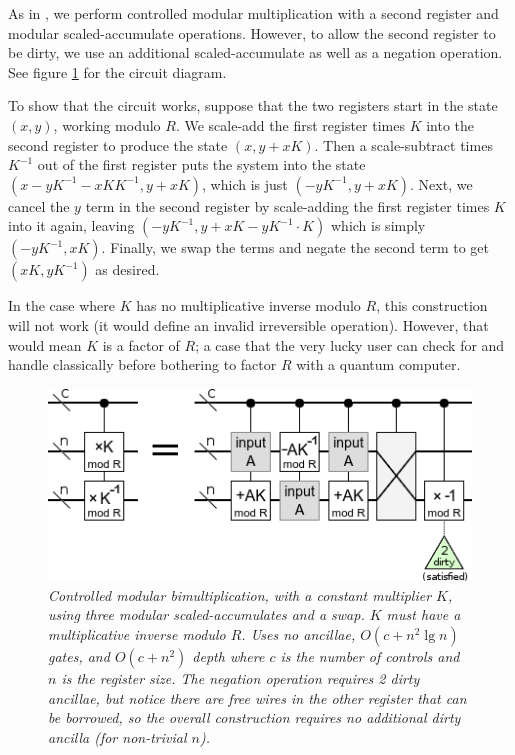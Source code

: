 \documentclass[twocolumn]{article}
\begin{document}
As in \cite{beauregard2003}, we perform controlled modular multiplication with a second register and modular scaled-accumulate operations.
However, to allow the second register to be dirty, we use an additional scaled-accumulate as well as a negation operation.
See figure \ref{fig:controlled-modular-multiply} for the circuit diagram.

To show that the circuit works, suppose that the two registers start in the state $(x, y)$, working modulo $R$.
We scale-add the first register times $K$ into the second register to produce the state $(x, y+xK)$.
Then a scale-subtract times $K^{-1}$ out of the first register puts the system into the state $(x-yK^{-1}-xKK^{-1}, y+xK)$, which is just $(-yK^{-1}, y+xK)$.
Next, we cancel the $y$ term in the second register by scale-adding the first register times $K$ into it again, leaving $(-yK^{-1}, y+xK-yK^{-1} \cdot K)$ which is simply $(-yK^{-1}, xK)$.
Finally, we swap the terms and negate the second term to get $(xK, yK^{-1})$ as desired.

In the case where $K$ has no multiplicative inverse modulo $R$, this construction will not work (it would define an invalid irreversible operation).
However, that would mean $K$ is a factor of $R$; a case that the very lucky user can check for and handle classically before bothering to factor $R$ with a quantum computer.

\begin{figure}
  \centering
  \includegraphics[width=\linewidth]{assets/controlled-modular-multiply.png}
  \caption{\em
    Controlled modular bimultiplication, with a constant multiplier $K$, using three modular scaled-accumulates and a swap.
    $K$ must have a multiplicative inverse modulo $R$.
    Uses no ancillae, $O(c + n^2 \lg n)$ gates, and $O(c + n^2)$ depth where $c$ is the number of controls and $n$ is the register size.
    The negation operation requires 2 dirty ancillae, but notice there are free wires in the other register that can be borrowed, so the overall construction requires no additional dirty ancilla (for non-trivial $n$).
  }
  \label{fig:controlled-modular-multiply}
\end{figure}
\end{document}
